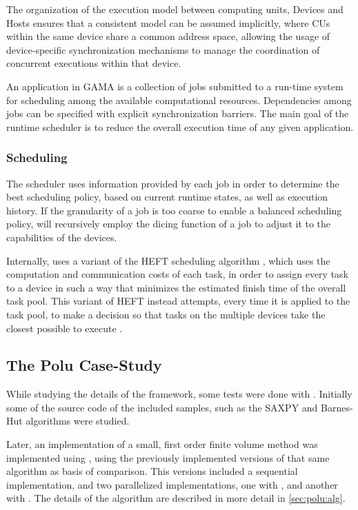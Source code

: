 \documentclass[main.tex]{subfiles}
\begin{document}
The organization of the execution model between computing units, Devices and Hosts ensures that a consistent model can be assumed implicitly, where \acsp{CU} within the same device share a common address space, allowing the usage of device-specific synchronization mechanisms to manage the coordination of concurrent executions within that device.

An application in GAMA is a collection of jobs submitted to a run-time system for scheduling among the available computational resources. Dependencies among jobs can be specified with explicit synchronization barriers. The main goal of the runtime scheduler is to reduce the overall execution time of any given application.

\subsubsection{Scheduling} \label{sec:gama_sched}

The scheduler uses information provided by each job in order to determine the best scheduling policy, based on current runtime states, as well as execution history. If the granularity of a job is too coarse to enable a balanced scheduling policy, \gama will recursively employ the dicing function of a job to adjust it to the capabilities of the devices.

Internally, \gama uses a variant of the \ac{HEFT} scheduling algorithm \cite{topcuoglu2002performance}, which uses the computation and communication costs of each task, in order to assign every task to a device in such a way that minimizes the estimated finish time of the overall task pool. This variant of \acs{HEFT} instead attempts, every time it is applied to the task pool, to make a decision so that tasks on the multiple devices take the closest possible to execute \cite{thesisMariano12}.


\subsection{The Polu Case-Study}

While studying the details of the framework, some tests were done with \gama. Initially some of the source code of the included samples, such as the SAXPY and Barnes-Hut algorithms were studied.

Later, an implementation of a small, first order finite volume method was implemented using \gama, using the previously implemented versions of that same algorithm as basis of comparison. This versions included a sequential implementation, and two parallelized implementations, one with \openmp, and another with \cuda. The details of the algorithm are described in more detail in \cref{sec:polu:alg}.
\end{document}
